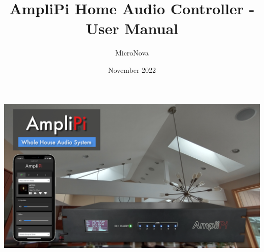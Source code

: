 \documentclass{article}
\title{AmpliPi Home Audio Controller - User Manual}
\author{MicroNova}
\date{November 2022}
\begin{document}
\maketitle
{}
\includegraphics{imgs/manual/main_graphic_16x9.jpg}
\newpage

\tableofcontents
\newpage
{}

\end{document}
